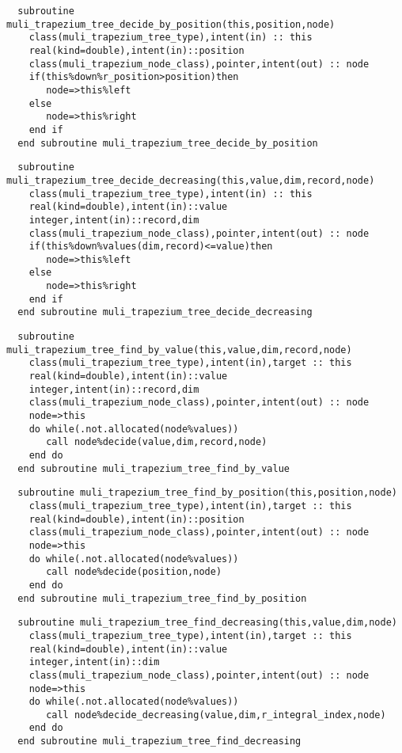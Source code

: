 \begin{Verbatim}
  subroutine muli_trapezium_tree_decide_by_position(this,position,node)
    class(muli_trapezium_tree_type),intent(in) :: this
    real(kind=double),intent(in)::position
    class(muli_trapezium_node_class),pointer,intent(out) :: node
    if(this%down%r_position>position)then
       node=>this%left
    else
       node=>this%right
    end if
  end subroutine muli_trapezium_tree_decide_by_position
\end{Verbatim}

\begin{Verbatim}
  subroutine muli_trapezium_tree_decide_decreasing(this,value,dim,record,node)
    class(muli_trapezium_tree_type),intent(in) :: this
    real(kind=double),intent(in)::value
    integer,intent(in)::record,dim
    class(muli_trapezium_node_class),pointer,intent(out) :: node
    if(this%down%values(dim,record)<=value)then
       node=>this%left
    else
       node=>this%right
    end if
  end subroutine muli_trapezium_tree_decide_decreasing
\end{Verbatim}

\begin{Verbatim}
  subroutine muli_trapezium_tree_find_by_value(this,value,dim,record,node)
    class(muli_trapezium_tree_type),intent(in),target :: this
    real(kind=double),intent(in)::value
    integer,intent(in)::record,dim
    class(muli_trapezium_node_class),pointer,intent(out) :: node
    node=>this
    do while(.not.allocated(node%values))
       call node%decide(value,dim,record,node)
    end do
  end subroutine muli_trapezium_tree_find_by_value
\end{Verbatim}

\begin{Verbatim}
  subroutine muli_trapezium_tree_find_by_position(this,position,node)
    class(muli_trapezium_tree_type),intent(in),target :: this
    real(kind=double),intent(in)::position
    class(muli_trapezium_node_class),pointer,intent(out) :: node
    node=>this
    do while(.not.allocated(node%values))
       call node%decide(position,node)
    end do
  end subroutine muli_trapezium_tree_find_by_position
\end{Verbatim}
\begin{Verbatim}
  subroutine muli_trapezium_tree_find_decreasing(this,value,dim,node)
    class(muli_trapezium_tree_type),intent(in),target :: this
    real(kind=double),intent(in)::value
    integer,intent(in)::dim
    class(muli_trapezium_node_class),pointer,intent(out) :: node
    node=>this
    do while(.not.allocated(node%values))
       call node%decide_decreasing(value,dim,r_integral_index,node)
    end do
  end subroutine muli_trapezium_tree_find_decreasing
\end{Verbatim}

